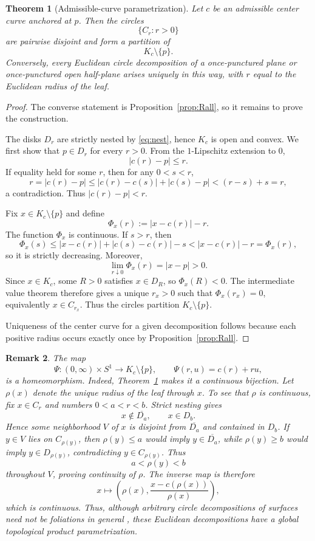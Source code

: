 \documentclass[11pt]{article}
\newtheorem{theorem}{Theorem}[section]
\newtheorem{remark}[theorem]{Remark}
\newcommand{\ol}{\overline}
\begin{document}
\begin{theorem}[Admissible-curve parametrization]\label{thm:admissible}
Let $c$ be an admissible center curve anchored at $p$. Then the circles
\[
\{C_r:r>0\}
\]
are pairwise disjoint and form a partition of
\[
K_c\setminus\{p\}.
\]
Conversely, every Euclidean circle decomposition of a once-punctured plane or once-punctured open half-plane arises uniquely in this way, with $r$ equal to the Euclidean radius of the leaf.
\end{theorem}

\begin{proof}
The converse statement is Proposition~\ref{prop:Rall}, so it remains to prove the construction.

The disks $D_r$ are strictly nested by \eqref{eq:nest}, hence $K_c$ is open and convex. We first show that $p\in D_r$ for every $r>0$. From the $1$-Lipschitz extension to $0$,
\[
|c(r)-p|\le r.
\]
If equality held for some $r$, then for any $0<s<r$,
\[
r=|c(r)-p|
\le |c(r)-c(s)|+|c(s)-p|
<(r-s)+s=r,
\]
a contradiction. Thus $|c(r)-p|<r$.

Fix $x\in K_c\setminus\{p\}$ and define
\[
\Phi_x(r):=|x-c(r)|-r.
\]
The function $\Phi_x$ is continuous. If $s>r$, then
\[
\Phi_x(s)
\le |x-c(r)|+|c(s)-c(r)|-s
<|x-c(r)|-r
=\Phi_x(r),
\]
so it is strictly decreasing. Moreover,
\[
\lim_{r\downarrow0}\Phi_x(r)=|x-p|>0.
\]
Since $x\in K_c$, some $R>0$ satisfies $x\in D_R$, so $\Phi_x(R)<0$. The intermediate value theorem therefore gives a unique $r_x>0$ such that $\Phi_x(r_x)=0$, equivalently $x\in C_{r_x}$. Thus the circles partition $K_c\setminus\{p\}$.

Uniqueness of the center curve for a given decomposition follows because each positive radius occurs exactly once by Proposition~\ref{prop:Rall}.
\end{proof}

\begin{remark}\label{rem:product}
The map
\[
\Psi:(0,\infty)\times S^1\longrightarrow K_c\setminus\{p\},
\qquad
\Psi(r,u)=c(r)+ru,
\]
is a homeomorphism. Indeed, Theorem~\ref{thm:admissible} makes it a continuous bijection. Let $\rho(x)$ denote the unique radius of the leaf through $x$. To see that $\rho$ is continuous, fix $x\in C_r$ and numbers $0<a<r<b$. Strict nesting gives
\[
x\notin\ol{D_a},\qquad x\in D_b.
\]
Hence some neighborhood $V$ of $x$ is disjoint from $\ol{D_a}$ and contained in $D_b$. If $y\in V$ lies on $C_{\rho(y)}$, then $\rho(y)\le a$ would imply $y\in\ol{D_a}$, while $\rho(y)\ge b$ would imply $y\in D_{\rho(y)}$, contradicting $y\in C_{\rho(y)}$. Thus
\[
a<\rho(y)<b
\]
throughout $V$, proving continuity of $\rho$. The inverse map is therefore
\[
x\longmapsto
\left(\rho(x),\frac{x-c(\rho(x))}{\rho(x)}\right),
\]
which is continuous. Thus, although arbitrary circle decompositions of surfaces need not be foliations in general \cite{MoussongSimanyi}, these Euclidean decompositions have a global topological product parametrization.
\end{remark}
\end{document}
